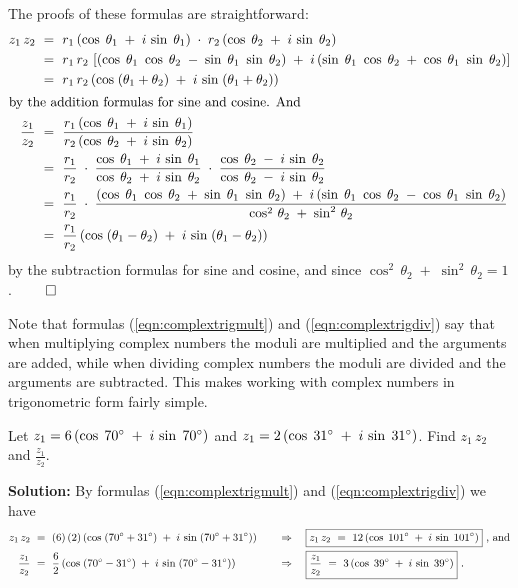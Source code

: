 \noindent The proofs of these formulas are straightforward:
\begin{align*}
 z_1 \, z_2 ~&=~ r_1 \,(\cos\;\theta_1 \;+\; i\,\sin\;\theta_1 ) \;\cdot\;
  r_2 \,(\cos\;\theta_2 \;+\; i\,\sin\;\theta_2 )\\
 &=~ r_1 \, r_2 \,\left[ (\cos\;\theta_1 ~ \cos\;\theta_2 \;-\; \sin\;\theta_1 ~ \sin\;\theta_2 )
  \;+\; i\,(\sin\;\theta_1 ~ \cos\;\theta_2 \;+\; \cos\;\theta_1 ~ \sin\;\theta_2 ) \right]\\
 &=~ r_1 \, r_2 \,(\cos\;(\theta_1 + \theta_2 ) \;+\; i\,\sin\;(\theta_1 + \theta_2 ))\\
 \intertext{by the addition formulas for sine and cosine. And}
 \frac{z_1}{z_2} ~&=~ \frac{r_1 \,(\cos\;\theta_1 \;+\; i\,\sin\;\theta_1 )}{
  r_2 \,(\cos\;\theta_2 \;+\; i\,\sin\;\theta_2 )}\\
 &=~ \frac{r_1}{r_2} \;\cdot\; \frac{\cos\;\theta_1 \;+\; i\,\sin\;\theta_1}{
  \cos\;\theta_2 \;+\; i\,\sin\;\theta_2} \;\cdot\; \frac{\cos\;\theta_2 \;-\; i\,\sin\;\theta_2}{
  \cos\;\theta_2 \;-\; i\,\sin\;\theta_2}\\
 &=~ \frac{r_1}{r_2} \;\cdot\; \frac{(\cos\;\theta_1 ~ \cos\;\theta_2 \;+\; \sin\;\theta_1 ~
  \sin\;\theta_2 ) \;+\; i\,(\sin\;\theta_1 ~ \cos\;\theta_2 \;-\; \cos\;\theta_1 ~
  \sin\;\theta_2 )}{\cos^2 \,\theta_2 \;+\; \sin^2 \,\theta_2}\\
 &=~ \frac{r_1}{r_2} \,(\cos\;(\theta_1 - \theta_2 ) \;+\; i\,\sin\;(\theta_1 - \theta_2 ))
\end{align*}
by the subtraction formulas for sine and cosine, and since $\cos^2 \,\theta_2 \;+\;
\sin^2 \,\theta_2 = 1$. $\qed$

Note that formulas (\ref{eqn:complextrigmult}) and (\ref{eqn:complextrigdiv}) say that when
multiplying complex numbers the moduli are multiplied and the arguments are added, while when
dividing complex numbers the moduli are divided and the arguments are subtracted. This makes
working with complex numbers in trigonometric form fairly simple.
\newpage
\begin{exmp}
 Let $z_1 = 6\,(\cos\;70^\circ \;+\; i\,\sin\;70^\circ )$ and
 $z_1 = 2\,(\cos\;31^\circ \;+\; i\,\sin\;31^\circ )$. Find $z_1 \, z_2$ and
 $\frac{z_1}{z_2}$.\vspace{1mm}
 \par\noindent\textbf{Solution:} By formulas (\ref{eqn:complextrigmult}) and
 (\ref{eqn:complextrigdiv}) we have
\begin{alignat*}{3}
 z_1 \, z_2 ~&=~ (6) \, (2) \, (\cos\;(70^\circ + 31^\circ ) \;+\; i\,\sin\;(70^\circ +
  31^\circ )) \quad&&\Rightarrow\quad \boxed{z_1 \, z_2 ~=~ 12 \, (\cos\;101^\circ \;+\;
  i\,\sin\;101^\circ )} ~\text{, and}\\
 \frac{z_1}{z_2} ~&=~ \frac{6}{2} \, (\cos\;(70^\circ - 31^\circ ) \;+\; i\,\sin\;(70^\circ -
  31^\circ )) \quad&&\Rightarrow\quad \boxed{\frac{z_1}{z_2} ~=~ 3 \, (\cos\;39^\circ \;+\;
  i\,\sin\;39^\circ )} ~.
\end{alignat*}
\end{exmp}
\divider
\vspace{1mm}

